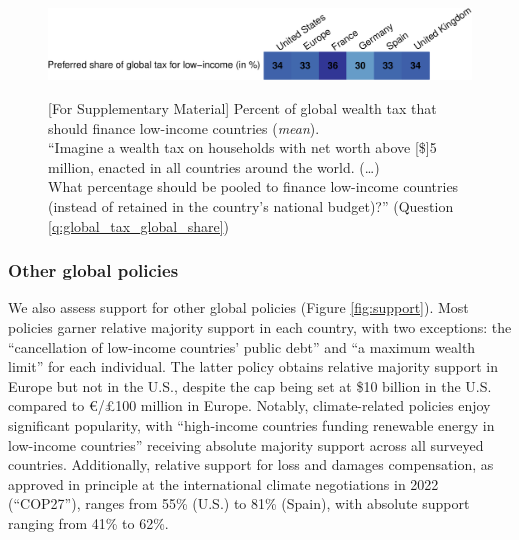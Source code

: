 \begin{figure}
    \centering 
    \caption[Preferred share of wealth tax for low-income countries]{[For Supplementary Material] Percent of global wealth tax that should finance low-income countries (\textit{mean}). \\ ``Imagine a wealth tax on households with net worth above [\$]5 million, enacted in all countries around the world.  
    (\dots)  \\
    What percentage should be pooled to finance low-income countries (instead of retained in the country's national budget)?'' (Question \ref{q:global_tax_global_share})} %
    \includegraphics[width=1\textwidth]{../figures/country_comparison/global_tax_global_share_mean.pdf} \label{fig:global_share_mean}
\end{figure}


\subsubsection{Other global policies}\label{subsubsec:support_other_global_policies} %

We also assess support for other global policies (Figure \ref{fig:support}). Most policies garner relative majority support in each country, with two exceptions: the ``cancellation of low-income countries' public debt'' and ``a maximum wealth limit'' for each individual. %
The latter policy obtains relative majority support in Europe but not in the U.S., despite the cap being set at \$10 billion in the U.S. compared to \euro{}/£100 million in Europe. Notably, climate-related policies enjoy significant popularity, with ``high-income countries funding renewable energy in low-income countries'' receiving absolute majority support across all surveyed countries. Additionally, relative support for loss and damages compensation, as approved in principle at the international climate negotiations in 2022 (``COP27''), ranges from 55\% (U.S.) to 81\% (Spain), with absolute support ranging from 41\% to 62\%.

